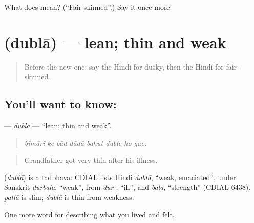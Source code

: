 \begin{tcolorbox}[breakable,colback=teal!4,colframe=teal!35!black,title={Before you move on}]
What does  mean? (\textquotedblleft{}Fair-skinned\textquotedblright{}.) Say it once more.
\end{tcolorbox}
\section[\texorpdfstring{\hi{दुबला} (dublā)}{दुबला (dublā)}]{ (dublā) — lean; thin and weak}

\label{lesson:HI-C482-dubla}



\begin{quote}
Before the new one: say the Hindi for dusky, then the Hindi for fair-skinned.
\end{quote}

\subsection*{You'll want to know: }
\textbf{} — \emph{dublā} — \textquotedblleft{}lean; thin and weak\textquotedblright{}.

\begin{quote}
       
\end{quote}

\begin{quote}
\emph{bīmārī ke bād dādā bahut duble ho gae.}
\end{quote}

\begin{quote}
Grandfather got very thin after his illness.
\end{quote}

\begin{cousinweb}
\textbf{} (\emph{dublā}) is a tadbhava: CDIAL lists Hindi \emph{dublā}, \textquotedblleft{}weak, emaciated\textquotedblright{}, under Sanskrit \emph{durbala}, \textquotedblleft{}weak\textquotedblright{}, from \emph{dur-}, \textquotedblleft{}ill\textquotedblright{}, and \emph{bala}, \textquotedblleft{}strength\textquotedblright{} (CDIAL 6438). \emph{patlā} is slim; \emph{dublā} is thin from weakness.
\end{cousinweb}

\begin{grammarlens}[title={What you've built}]
One more word for describing what you lived and felt.
\end{grammarlens}

